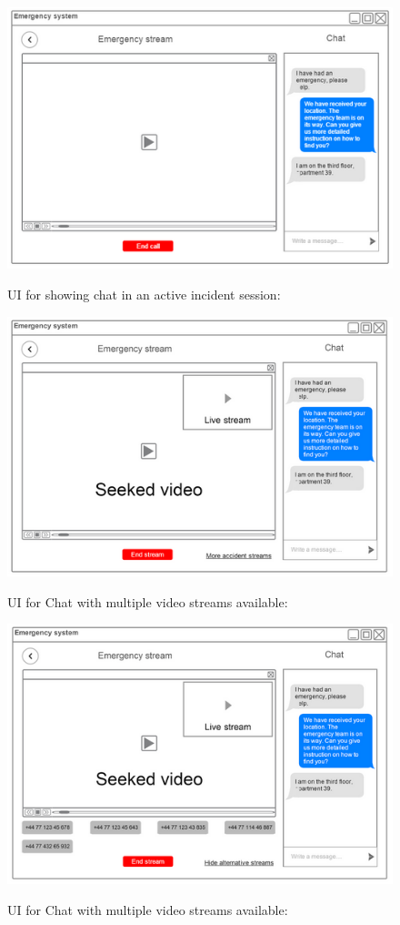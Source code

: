 \documentclass{article}
\begin{document}
	
	\begin{figure}[h]
		\centering
		\includegraphics[width=.8\textwidth]{"Chat/4"}

		UI for showing chat in an active incident session:
	\vspace{-30pt}
	\end{figure} \clearpage
	
	
	\begin{figure}[h]
	\vspace{-30pt}
		\centering
		\includegraphics[width=.8\textwidth]{"Chat/5"}

		UI for Chat with multiple video streams available:
	\end{figure} 
	
	\begin{figure}[h]
		\centering
		\includegraphics[width=.8\textwidth]{"Chat/6"}

		UI for Chat with multiple video streams available:

	\vspace{-30pt}
	\end{figure} \clearpage
	
\end{document}
